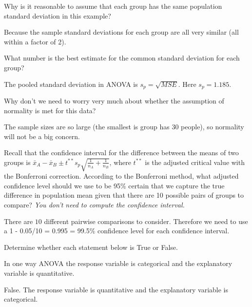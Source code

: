 \documentclass[11pt]{exam}
\newcommand{\ds}{\displaystyle}
\begin{document}
\begin{questions}
\begin{parts}
\item Why is it reasonable to assume that each group has the same population standard deviation in this example? 
\begin{solution}
Because the sample standard deviations for each group are all very similar (all within a factor of 2).
\end{solution}
\vfill

\item What number is the best estimate for the common standard deviation for each group?
\begin{solution}
The pooled standard deviation in ANOVA is $s_p = \sqrt{MSE}$.  Here $s_p = 1.185$.
\end{solution}
\vfill


\item Why don't we need to worry very much about whether the assumption of normality is met for this data? 
\begin{solution}
The sample sizes are so large (the smallest is group has 30 people), so normality will not be a big concern.
\end{solution}
\vfill

\newpage
\item Recall that the confidence interval for the difference between the means of two groups is $\ds \bar{x}_A - \bar{x}_B \pm t^{**} s_p \sqrt{\frac{1}{n_A} + \frac{1}{n_B}}$, where $t^{**}$ is the adjusted critical value with the Bonferroni correction.  According to the Bonferroni method, what adjusted confidence level should we use to be 95\% certain that we capture the true difference in population mean given that there are 10 possible pairs of groups to compare? \textit{You don't need to compute the confidence interval.}  
\begin{solution}
There are $10$ different pairwise comparisons to consider. Therefore we need to use a 1 - 0.05/10 = 0.995 = 99.5\% confidence level for each confidence interval.   
\end{solution}
\vfill
\vfill

\end{parts}

\question Determine whether each statement below is True or False.   
\begin{parts}
\item In one way ANOVA the response variable is categorical and the explanatory variable is quantitative.  
\begin{solution}
False. The response variable is quantitative and  the explanatory variable is  categorical.
\end{solution}
\vfill



\end{parts}
\end{questions}
\end{document}
